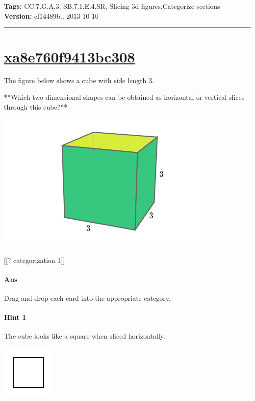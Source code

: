 \documentclass[twocolumn,10pt]{article}
\def\shrinkfactor{0.4}
\begin{document}
\medskip
\noindent
\textbf{Tags:} {\footnotesize CC.7.G.A.3, SB.7.1.E.4.SR, Slicing 3d figures.Categorize sections}\\
\textbf{Version:} cf14489b.. 2013-10-10
\smallskip\hrule





\section{\href{https://www.khanacademy.org/devadmin/content/items/xa8e760f9413bc308}{xa8e760f9413bc308}}

\noindent
The figure below shows a cube with side length $3$. 

**Which two dimensional shapes can be obtained as  horizontal or vertical slices through this cube?**  


\includegraphics[scale=\shrinkfactor]{figures/3f4348c08edc4429693936406a5d387a49f9f22e.png}

[[? categorization 1]]

\paragraph{Ans} Drag and drop each card into the appropriate category. 

\paragraph{Hint 1}The cube looks like a square when sliced horizontally.  

\includegraphics[scale=\shrinkfactor]{figures/4b59a0ece6acc7c19c389e1de534d1df93bf1169.png}
\end{document}
